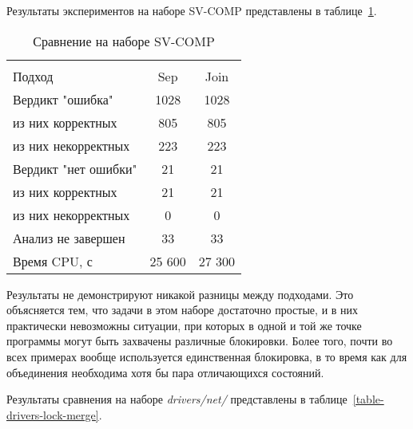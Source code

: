 Результаты экспериментов на наборе SV-COMP представлены в таблице~\ref{table-svcomp-lock-merge}.

  \begin{table}[h]\footnotesize \centering
    \caption{Сравнение на наборе SV-COMP}
  	\label{table-svcomp-lock-merge}
    \begin{tabular}{ | l | c | c |}
      \hline
      		& 		\multicolumn{2}{c|}{\theory}  \\
      Подход         				&  Sep		& Join 		\\ \hline
      Вердикт "ошибка" 				& 1028   	& 1028   	\\ 
  \hspace{0.5cm} из них корректных 	& 805 		& 805 	 	\\ 
  \hspace{0.5cm} из них некорректных & 223 		& 223 	   	\\ \hline
      Вердикт "нет ошибки"  		& 21    	& 21     	\\ 
  \hspace{0.5cm} из них корректных 	& 21 		& 21    	\\
  \hspace{0.5cm} из них некорректных & 0 		& 0    	  	\\ \hline
      Анализ не завершен       		& 33    	& 33      	\\ \hline
      Время CPU, с   				& 25 600 	& 27 300  	\\ 
      \hline
    \end{tabular}
  \end{table}

Результаты не демонстрируют никакой разницы между подходами.
Это объясняется тем, что задачи в этом наборе достаточно простые, и в них практически невозможны ситуации, при которых в одной и той же точке программы могут быть захвачены различные блокировки.
Более того, почти во всех примерах вообще используется единственная блокировка, в то время как для объединения необходима хотя бы пара отличающихся состояний.

Результаты сравнения на наборе \textit{drivers/net/} представлены в таблице~\ref{table-drivers-lock-merge}.

